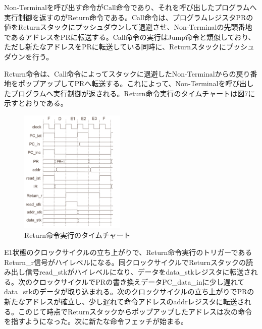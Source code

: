 \documentclass[submit,techrep]{ipsj}
\begin{document}
Non-Terminalを呼び出す命令がCall命令であり、それを呼び出したプログラムへ実行制御を返すのがReturn命令である。Call命令は、プログラムレジスタPRの値をReturnスタックにプッシュダウンして退避させ、Non-Terminalの先頭番地であるアドレスをPRに転送する。Call命令の実行はJump命令と類似しており、ただし新たなアドレスをPRに転送している同時に、Returnスタックにプッシュダウンを行う。

Return命令は、Call命令によってスタックに退避したNon-Terminalからの戻り番地をポップアップしてPRへ転送する。これによって、Non-Terminalを呼び出したプログラムへ実行制御が返される。Return命令実行のタイムチャートは図7に示すとおりである。

\begin{figure}[h]
    \begin{center}
        \includegraphics[width=50mm]{./fig/Return}
       \caption{Return命令実行のタイムチャート}
    \end{center}
\end{figure}

E1状態のクロックサイクルの立ち上がりで、Return命令実行のトリガーであるReturn\_r信号がハイレベルになる。同クロックサイクルでReturnスタックの読み出し信号read\_stkがハイレベルになり、データをdata\_stkレジスタに転送される。次のクロックサイクルでPRの書き換えデータPC\_data\_inに少し遅れてdata\_stkのデータが取り込まれる。次のクロックサイクルの立ち上がりでPRの新たなアドレスが確立し、少し遅れて命令アドレスのaddrレジスタに転送される。このじて時点でReturnスタックからポップアップしたアドレスは次の命令を指すようになった。次に新たな命令フェッチが始まる。


\end{document}
